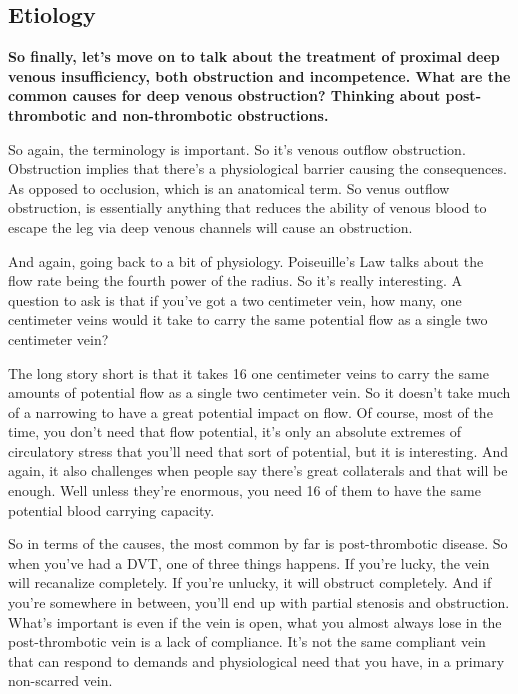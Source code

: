 \documentclass[
]{book}
\begin{document}
\hypertarget{etiology-11}{%
\subsection{Etiology}\label{etiology-11}}

\textbf{So finally, let's move on to talk about the treatment of proximal deep
venous insufficiency, both obstruction and incompetence. What are the
common causes for deep venous obstruction? Thinking about
post-thrombotic and non-thrombotic obstructions.}

So again, the terminology is important. So it's venous outflow
obstruction. Obstruction implies that there's a physiological barrier
causing the consequences. As opposed to occlusion, which is an
anatomical term. So venus outflow obstruction, is essentially anything
that reduces the ability of venous blood to escape the leg via deep
venous channels will cause an obstruction.

And again, going back to a bit of physiology. Poiseuille's Law talks
about the flow rate being the fourth power of the radius. So it's really
interesting. A question to ask is that if you've got a two centimeter
vein, how many, one centimeter veins would it take to carry the same
potential flow as a single two centimeter vein?

The long story short is that it takes 16 one centimeter veins to carry
the same amounts of potential flow as a single two centimeter vein. So
it doesn't take much of a narrowing to have a great potential impact on
flow. Of course, most of the time, you don't need that flow potential,
it's only an absolute extremes of circulatory stress that you'll need
that sort of potential, but it is interesting. And again, it also
challenges when people say there's great collaterals and that will be
enough. Well unless they're enormous, you need 16 of them to have the
same potential blood carrying capacity.

So in terms of the causes, the most common by far is post-thrombotic
disease. So when you've had a DVT, one of three things happens. If
you're lucky, the vein will recanalize completely. If you're unlucky, it
will obstruct completely. And if you're somewhere in between, you'll end
up with partial stenosis and obstruction. What's important is even if
the vein is open, what you almost always lose in the post-thrombotic
vein is a lack of compliance. It's not the same compliant vein that can
respond to demands and physiological need that you have, in a primary
non-scarred vein.
\end{document}
